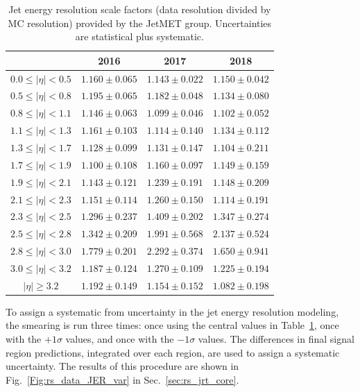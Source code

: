 \begin{table}[t]
\caption{Jet energy resolution scale factors (data resolution divided by MC resolution) provided by the JetMET group.
             Uncertainties are statistical plus systematic.}
\label{tab:jrt_jersfs}
\centering
\begin{tabular}{|c|ccc|}
\hline
 & 2016 & 2017 & 2018 \\ \hline
$0.0 \leq |\eta| < 0.5$ & $1.160\pm0.065$ & $1.143\pm0.022$ & $1.150\pm0.042$ \\
$0.5 \leq |\eta| < 0.8$ & $1.195\pm0.065$ & $1.182\pm0.048$ & $1.134\pm0.080$ \\
$0.8 \leq |\eta| < 1.1$ & $1.146\pm0.063$ & $1.099\pm0.046$ & $1.102\pm0.052$ \\
$1.1 \leq |\eta| < 1.3$ & $1.161\pm0.103$ & $1.114\pm0.140$ & $1.134\pm0.112$ \\
$1.3 \leq |\eta| < 1.7$ & $1.128\pm0.099$ & $1.131\pm0.147$ & $1.104\pm0.211$ \\
$1.7 \leq |\eta| < 1.9$ & $1.100\pm0.108$ & $1.160\pm0.097$ & $1.149\pm0.159$ \\
$1.9 \leq |\eta| < 2.1$ & $1.143\pm0.121$ & $1.239\pm0.191$ & $1.148\pm0.209$ \\
$2.1 \leq |\eta| < 2.3$ & $1.151\pm0.114$ & $1.260\pm0.150$ & $1.114\pm0.191$ \\
$2.3 \leq |\eta| < 2.5$ & $1.296\pm0.237$ & $1.409\pm0.202$ & $1.347\pm0.274$ \\
$2.5 \leq |\eta| < 2.8$ & $1.342\pm0.209$ & $1.991\pm0.568$ & $2.137\pm0.524$ \\
$2.8 \leq |\eta| < 3.0$ & $1.779\pm0.201$ & $2.292\pm0.374$ & $1.650\pm0.941$ \\
$3.0 \leq |\eta| < 3.2$ & $1.187\pm0.124$ & $1.270\pm0.109$ & $1.225\pm0.194$ \\
$|\eta| \geq 3.2$       & $1.192\pm0.149$ & $1.154\pm0.152$ & $1.082\pm0.198$ \\
\hline
\end{tabular}
\end{table}

To assign a systematic from uncertainty in the jet energy resolution modeling, the smearing is run three times:
once using the central values in Table~\ref{tab:jrt_jersfs}, once with the $+1\sigma$ values,
and once with the $-1\sigma$ values. The differences in final signal region predictions,
integrated over each \Ht region, are used to assign a systematic uncertainty. The results of this
procedure are shown in Fig.~\ref{Fig:rs_data_JER_var} in Sec.~\ref{sec:rs_jrt_core}.

